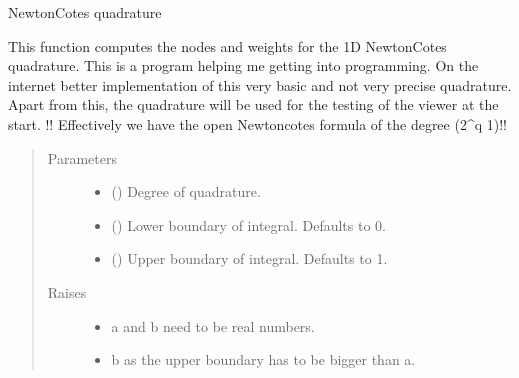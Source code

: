 \documentclass[letterpaper,10pt,english]{sphinxmanual}
\begin{document}
\begin{fulllineitems}
\label{\detokenize{index:Studienprojekt_Smolyak_qmc_one_point.one_dim_newton_cotes}}
Newton\sphinxhyphen{}Cotes quadrature

This function computes the nodes and weights for the 1D Newton\sphinxhyphen{}Cotes quadrature.
This is a program helping me getting into programming. On the internet better implementation of
this very basic and not very precise quadrature. Apart from this, the quadrature will be used for the
testing of the viewer at the start. !! Effectively we have the open Newton\sphinxhyphen{}cotes formula of the degree (2\textasciicircum{}q \sphinxhyphen{} 1)!!
\begin{quote}\begin{description}
\item[{Parameters}] \leavevmode\begin{itemize}
\item {} 
 () \textendash{} Degree of quadrature.

\item {} 
 (\sphinxstyleliteralemphasis{\sphinxupquote{, }}) \textendash{} Lower boundary of integral. Defaults to 0.

\item {} 
 (\sphinxstyleliteralemphasis{\sphinxupquote{, }}) \textendash{} Upper boundary of integral. Defaults to 1.

\end{itemize}

\item[{Raises}] \leavevmode\begin{itemize}
\item {} 
 \textendash{} a and b need to be real numbers.

\item {} 
 \textendash{} b as the upper boundary has to be bigger than a.


\end{itemize}
\end{description}
\end{quote}
\end{fulllineitems}
\end{document}
